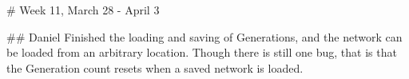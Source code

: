 # Week 11, March 28 - April 3

## Daniel
Finished the loading and saving of Generations, and the network can be loaded from an arbitrary location. Though there is still one bug, that is that the Generation count resets when a saved network is loaded.